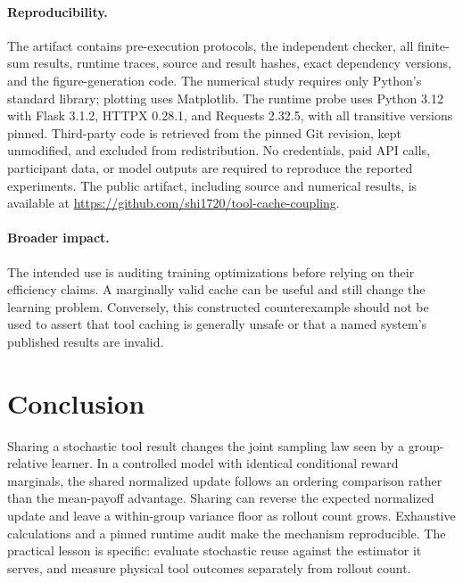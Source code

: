 \documentclass[10pt,letterpaper]{article}
\begin{document}
\paragraph{Reproducibility.}
The artifact contains pre-execution protocols, the independent checker, all
finite-sum results, runtime traces, source and result hashes, exact dependency
versions, and the figure-generation code. The numerical study requires only
Python's standard library; plotting uses Matplotlib. The runtime probe uses
Python 3.12 with Flask 3.1.2, HTTPX 0.28.1, and Requests 2.32.5, with all
transitive versions pinned. Third-party code is retrieved from the pinned Git
revision, kept unmodified, and excluded from redistribution. No credentials,
paid API calls, participant data, or model outputs are required to reproduce
the reported experiments. The public artifact, including source and numerical
results, is available at \url{https://github.com/shi1720/tool-cache-coupling}.

\paragraph{Broader impact.}
The intended use is auditing training optimizations before relying on their
efficiency claims. A marginally valid cache can be useful and still change the
learning problem. Conversely, this constructed counterexample should not be
used to assert that tool caching is generally unsafe or that a named system's
published results are invalid.

\section{Conclusion}
Sharing a stochastic tool result changes the joint sampling law seen by a
group-relative learner. In a controlled model with identical conditional reward
marginals, the shared normalized update follows an ordering comparison rather
than the mean-payoff advantage. Sharing can reverse the expected normalized
update and leave a
within-group variance floor as rollout count grows. Exhaustive calculations and
a pinned runtime audit make the mechanism reproducible. The practical lesson
is specific: evaluate stochastic reuse against the estimator it serves, and
measure physical tool outcomes separately from rollout count.
\end{document}
